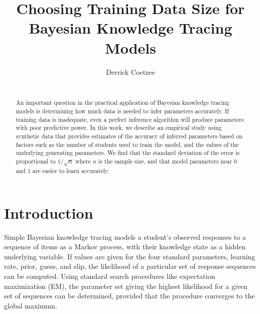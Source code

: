 \documentclass{edm_template}
\begin{document}
\title{Choosing Training Data Size for Bayesian Knowledge Tracing Models
}

\author{
\alignauthor
Derrick Coetzee\\
       \\
}

\maketitle
\begin{abstract}
An important question in the practical application of Bayesian knowledge
tracing models is determining how much data is needed to infer
parameters accurately. If training data is inadequate, even a perfect
inference algorithm will produce parameters with poor predictive
power. In this work, we describe an empirical study using synthetic
data that provides estimates of the accuracy of inferred parameters
based on factors such as the number of students used to train the model,
and the values of the underlying generating parameters. We find that
the standard deviation of the error is proportional to $1/\sqrt{n}$ where
$n$ is the sample size, and that model parameters near 0 and 1 are easier
to learn accurately.
\end{abstract}

%


\section{Introduction}
Simple Bayesian knowledge tracing models a student's observed responses to a sequence of items
as a Markov process, with their knowledge state as a hidden underlying variable. If values
are given for the four standard parameters, learning rate, prior, guess, and slip, the
likelihood of a particular set of response sequences can be computed. Using standard search
procedures like expectation maximization (EM), the parameter set giving the highest likelihood
for a given set of sequences can be determined, provided that the procedure converges to the global
maximum.
\end{document}
